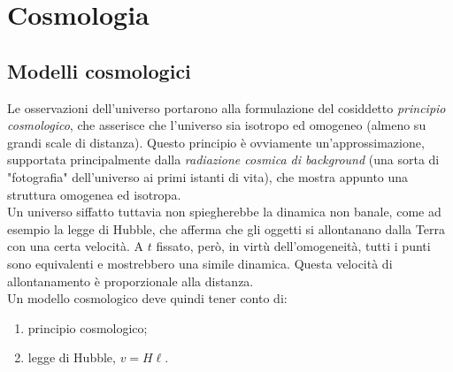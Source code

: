 \documentclass[12pt,a4paper]{report}
\theoremstyle{definition}
\begin{document}
\chapter{Cosmologia}
\section{Modelli cosmologici}
Le osservazioni dell'universo portarono alla formulazione del cosiddetto \emph{principio cosmologico}, che asserisce che l'universo sia isotropo ed omogeneo (almeno su grandi scale di distanza). Questo principio è ovviamente un'approssimazione, supportata principalmente dalla \emph{radiazione cosmica di background} (una sorta di "fotografia" dell'universo ai primi istanti di vita), che mostra appunto una struttura omogenea ed isotropa. \\
Un universo siffatto tuttavia non spiegherebbe la dinamica non banale, come ad esempio la legge di Hubble, che afferma che gli oggetti si allontanano dalla Terra con una certa velocità. A $t$ fissato, però, in virtù dell'omogeneità, tutti i punti sono equivalenti e mostrebbero una simile dinamica. Questa velocità di allontanamento è proporzionale alla distanza. \\
Un modello cosmologico deve quindi tener conto di:
\begin{enumerate}
\item principio cosmologico;
\item legge di Hubble, $v=H\ell$.
\end{enumerate}
\end{document}
